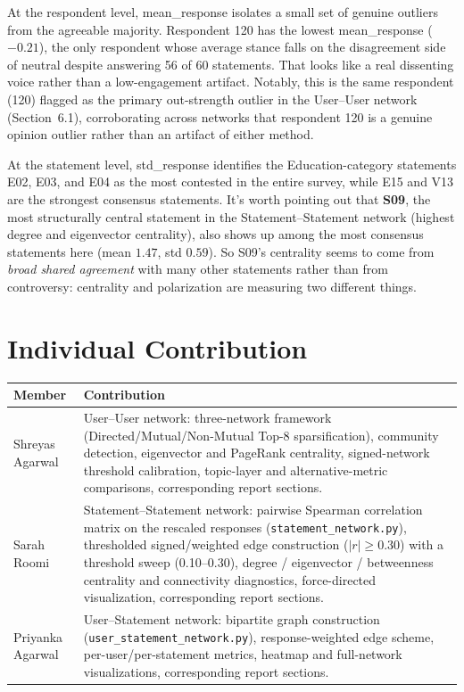 \documentclass[11pt]{article}
\begin{document}
At the respondent level, mean\_response isolates a small set of genuine outliers from the agreeable
majority. Respondent 120 has the lowest mean\_response ($-0.21$), the only respondent whose average
stance falls on the disagreement side of neutral despite answering 56 of 60 statements. That looks
like a real dissenting voice rather than a low-engagement artifact. Notably, this is the same
respondent (120) flagged as the primary out-strength outlier in the User--User network
(Section~6.1), corroborating across networks that respondent 120 is a genuine opinion outlier
rather than an artifact of either method.

At the statement level, std\_response identifies the Education-category statements E02, E03, and E04
as the most contested in the entire survey, while E15 and V13 are the strongest consensus statements.
It's worth pointing out that \textbf{S09}, the most structurally central statement in the
Statement--Statement network (highest degree and eigenvector centrality), also shows up among the
most consensus statements here (mean $1.47$, std $0.59$). So S09's centrality seems to come from
\emph{broad shared agreement} with many other statements rather than from controversy: centrality
and polarization are measuring two different things.


\section{Individual Contribution}

\begin{center}
\begin{tabular}{p{3cm}p{10cm}}
\toprule
\textbf{Member} & \textbf{Contribution} \\
\midrule
Shreyas Agarwal & User--User network: three-network framework (Directed/Mutual/Non-Mutual Top-8 sparsification), community detection, eigenvector and PageRank centrality, signed-network threshold calibration, topic-layer and alternative-metric comparisons, corresponding report sections. \\
\addlinespace
Sarah Roomi & Statement--Statement network: pairwise Spearman correlation matrix on the rescaled responses (\texttt{statement\_network.py}), thresholded signed/weighted edge construction ($|r| \geq 0.30$) with a threshold sweep (0.10--0.30), degree / eigenvector / betweenness centrality and connectivity diagnostics, force-directed visualization, corresponding report sections. \\
\addlinespace
Priyanka Agarwal & User--Statement network: bipartite graph construction (\texttt{user\_statement\_network.py}), response-weighted edge scheme, per-user/per-statement metrics, heatmap and full-network visualizations, corresponding report sections. \\
\bottomrule
\end{tabular}
\end{center}
\end{document}
